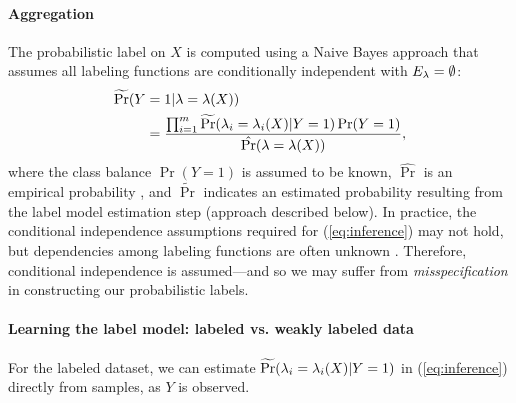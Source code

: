 \paragraph{Aggregation} The probabilistic label on $X$ is computed using a Naive Bayes approach that assumes all labeling functions are conditionally independent with $E_{\lambda} = \emptyset$:
\begin{align}
    \widetilde{\Pr}(Y &= 1 | \lambda = \lambda(X)) \\
    &= \frac{\prod_{i = 1}^m \widetilde{\Pr}(\lambda_i = \lambda_i(X) | Y = 1) \Pr(Y = 1)}{\hat{\Pr}(\lambda = \lambda(X))}, 
    \label{eq:inference}
\end{align}
where the class balance $\Pr(Y = 1)$ is assumed to be known, $\hat{\Pr}$ is an empirical probability 
, and $\widetilde{\Pr}$ indicates an estimated probability resulting from the label model estimation step (approach described below). %
%
In practice, the conditional independence assumptions required for (\ref{eq:inference}) may not hold, but dependencies among labeling functions are often unknown%
. Therefore, conditional independence is assumed---and so we may suffer from \emph{misspecification} in constructing our probabilistic labels. %


\paragraph{Learning the label model: labeled vs. weakly labeled data}
For the labeled dataset, we can estimate $\widetilde{\Pr}(\lambda_i = \lambda_i(X) | Y = 1)$ in (\ref{eq:inference}) directly from samples, as $Y$ is observed. 

